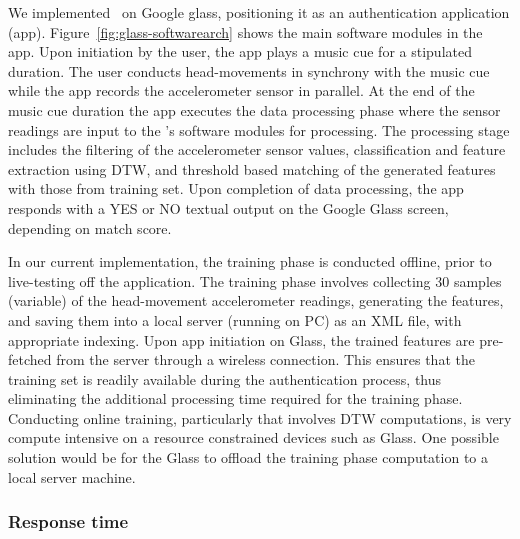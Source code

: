 We implemented \systemname~on Google glass, positioning it as an 
authentication application (app). 
Figure~\ref{fig:glass-softwarearch} shows the main software modules in the 
app. Upon initiation by the user, the app plays a music cue for a stipulated 
duration. The user conducts head-movements in synchrony with the music cue 
while the app records the accelerometer sensor in parallel. At the end of the 
music cue duration the app executes the data processing phase where the 
sensor readings are input to the \systemname's software modules for 
processing. The processing stage includes the filtering of the accelerometer 
sensor values, classification and feature extraction using DTW, and threshold 
based matching of the generated features with those from training set.
Upon completion of data processing, the app responds with a YES or NO textual 
output on the Google Glass screen, depending on match score.

In our current implementation, the training phase is conducted offline, prior 
to live-testing off the application.
The training phase involves collecting 30 samples (variable) of the 
head-movement accelerometer readings, generating the features, and saving them 
into a local server (running on PC) as an XML file, with appropriate indexing. 
Upon app initiation on Glass, the trained features are pre-fetched from 
the server through a wireless connection. This ensures that the training set 
is readily available during the authentication process, thus eliminating the 
additional processing time required for the training phase.
Conducting online training, particularly that involves DTW computations, is 
very compute intensive on a resource constrained devices such as Glass. 
One possible solution would be for the Glass to offload the 
training phase computation to a local server machine.

\subsubsection{Response time}

